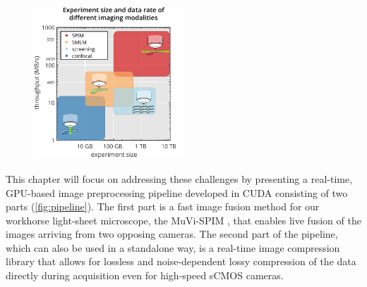  \begin{figure}[btp]
    \centering
    \includegraphics[page=1,width=0.5\textwidth]{comparison_with_pictograms}
    \label{fig:sizes}
  \end{figure}


  This chapter will focus on addressing these challenges by presenting a real-time, GPU-based image preprocessing pipeline developed in CUDA \cite{nickolls_scalable_2008} consisting of two parts (\autoref{fig:pipeline}).
  The first part is a fast image fusion method for our workhorse light-sheet microscope, the MuVi-SPIM \cite{krzic_multiview_2012}, that enables live fusion of the images arriving from two opposing cameras.
  The second part of the pipeline, which can also be used in a standalone way, is a real-time image compression library that allows for lossless and noise-dependent lossy compression of the data directly during acquisition even for high-speed sCMOS cameras.


